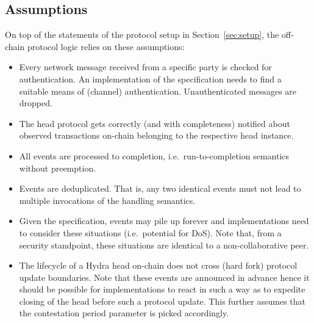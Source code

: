 \subsection{Assumptions}

On top of the statements of the protocol setup in Section~\ref{sec:setup}, the
off-chain protocol logic relies on these assumptions:
\begin{itemize}
	\item Every network message received from a specific party is checked for
	      authentication. An implementation of the specification needs to find a
	      suitable means of (channel) authentication. Unauthenticated messages are
	      dropped.
	\item The head protocol gets correctly (and with completeness) notified about
	      observed transactions on-chain belonging to the respective head
	      instance.
	\item All events are processed to completion, i.e.\ run-to-completion semantics
	      without preemption.
	\item Events are deduplicated. That is, any two identical events must not lead
	      to multiple invocations of the handling semantics.
	\item Given the specification, events may pile up forever and implementations
	      need to consider these situations (i.e.\ potential for DoS). Note that,
	      from a security standpoint, these situations are identical to a
	      non-collaborative peer.
	\item The lifecycle of a Hydra head on-chain does not cross (hard fork)
	      protocol update boundaries. Note that these events are announced in
	      advance hence it should be possible for implementations to react in such
	      a way as to expedite closing of the head before such a protocol update.
	      This further assumes that the contestation period parameter is picked
	      accordingly.
\end{itemize}


